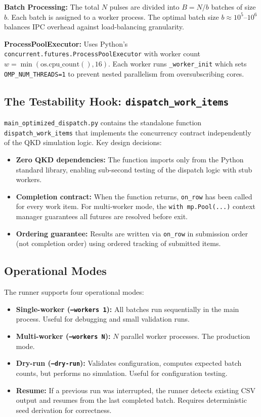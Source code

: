 \documentclass[11pt,a4paper,oneside]{report}
\begin{document}
\textbf{Batch Processing:} The total $N$ pulses are divided into $B = N/b$ batches of size $b$. Each batch is assigned to a worker process. The optimal batch size $b \approx 10^5$–$10^6$ balances IPC overhead against load-balancing granularity.

\textbf{ProcessPoolExecutor:} Uses Python's \texttt{concurrent.futures.ProcessPoolExecutor} with worker count $w = \min(\text{os.cpu\_count}(), 16)$. Each worker runs \texttt{\_worker\_init} which sets \texttt{OMP\_NUM\_THREADS=1} to prevent nested parallelism from oversubscribing cores.

\subsection{The Testability Hook: \texttt{dispatch\_work\_items}}

\texttt{main\_optimized\_dispatch.py} contains the standalone function \texttt{dispatch\_work\_items} that implements the concurrency contract independently of the QKD simulation logic. Key design decisions:

\begin{itemize}
\item \textbf{Zero QKD dependencies:} The function imports only from the Python standard library, enabling sub-second testing of the dispatch logic with stub workers.
\item \textbf{Completion contract:} When the function returns, \texttt{on\_row} has been called for every work item. For multi-worker mode, the \texttt{with mp.Pool(...)} context manager guarantees all futures are resolved before exit.
\item \textbf{Ordering guarantee:} Results are written via \texttt{on\_row} in submission order (not completion order) using ordered tracking of submitted items.
\end{itemize}

\subsection{Operational Modes}

The runner supports four operational modes:

\begin{itemize}
\item \textbf{Single-worker (\texttt{--workers 1}):} All batches run sequentially in the main process. Useful for debugging and small validation runs.
\item \textbf{Multi-worker (\texttt{--workers N}):} $N$ parallel worker processes. The production mode.
\item \textbf{Dry-run (\texttt{--dry-run}):} Validates configuration, computes expected batch counts, but performs no simulation. Useful for configuration testing.
\item \textbf{Resume:} If a previous run was interrupted, the runner detects existing CSV output and resumes from the last completed batch. Requires deterministic seed derivation for correctness.
\end{itemize}
\end{document}
